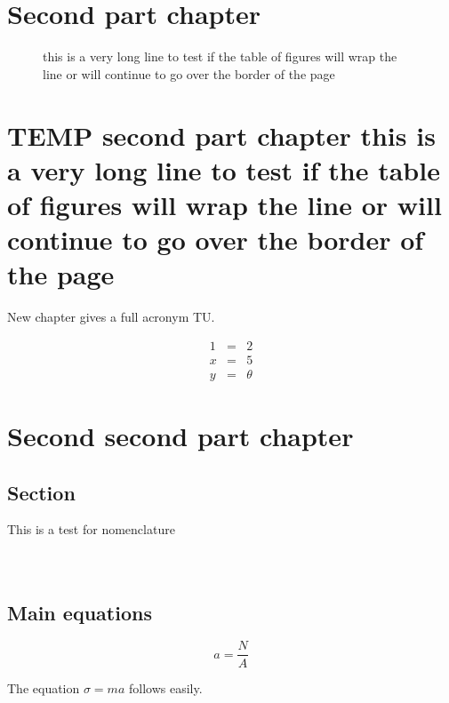     \chapter{Second part chapter}
   \begin{figure}
    \caption{this is a very long line to test if the table of
    figures will wrap the line or will continue to go over the
    border  of the page}
    \end{figure}

    \chapter{TEMP second part chapter this is a very long line to test if the table of
    figures will wrap the line or will continue to go over the
    border  of the page}

New chapter gives a full acronym \ac{TU}.

\begin{eqnarray}
  1 &=& 2\\
  x &=& 5 \\
  y &=& \theta
\end{eqnarray}

    \chapter{Second second part chapter}
    \section{Section}

    This is a test for nomenclature \\
    \\
    \\
\section{Main equations}

\begin{equation}
a=\frac{N}{A}
\end{equation}%

%
%
%

The equation $\sigma = m a$%
%
follows easily.